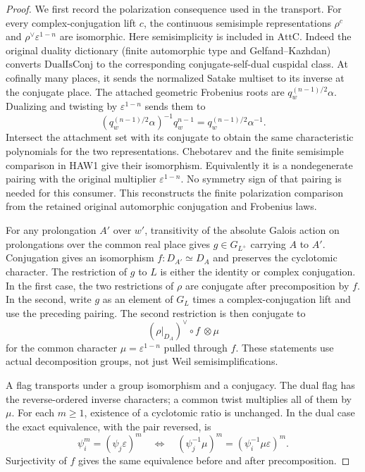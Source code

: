 \documentclass[11pt,a4paper]{article}
\numberwithin{equation}{section}
\theoremstyle{remark}\newtheorem{remark}[theorem]{Remark}
\begin{document}
\begin{proof}
We first record the polarization consequence used in the
transport.  For every complex-conjugation lift $c$, the
continuous semisimple representations
$\rho^c$ and $\rho^\vee\varepsilon^{1-n}$ are isomorphic.
Here semisimplicity is included in $\mathrm{AttC}$.
Indeed the original duality dictionary (finite automorphic
type and Gelfand--Kazhdan) converts $\mathrm{DualIsConj}$
to the corresponding conjugate-self-dual cuspidal class.
At cofinally many places, it sends the normalized Satake
multiset to its inverse at the conjugate place.  The attached
geometric Frobenius roots are $q_w^{(n-1)/2}\alpha$.
Dualizing and twisting by $\varepsilon^{1-n}$ sends them to
\[
       (q_w^{(n-1)/2}\alpha)^{-1}q_w^{n-1}
                             =q_w^{(n-1)/2}\alpha^{-1}.
\]
Intersect the attachment set with its conjugate to obtain
the same characteristic polynomials for the two
representations.  Chebotarev and the finite semisimple
comparison in HAW1 give their isomorphism.  Equivalently it
is a nondegenerate pairing with the original multiplier
$\varepsilon^{1-n}$.  No symmetry sign of that pairing is
needed for this consumer.  This reconstructs the finite
polarization comparison from the retained original
automorphic conjugation and Frobenius laws.

For any prolongation $A'$ over $w'$, transitivity of the
absolute Galois action on prolongations over the common real
place gives $g\in G_{L^+}$ carrying $A$ to $A'$.  Conjugation
gives an isomorphism $f:D_{A'}\simeq D_A$ and preserves
the cyclotomic character.  The restriction of $g$ to $L$ is
either the identity or complex conjugation.  In the first
case, the two restrictions of $\rho$ are conjugate after
precomposition by $f$.  In the second, write $g$ as an
element of $G_L$ times a complex-conjugation lift and use
the preceding pairing.  The second restriction is then
conjugate to
\[
          (\rho|_{D_A})^\vee\circ f\ \otimes\mu
 \tag{HAW.21}
\]
for the common character $\mu=\varepsilon^{1-n}$ pulled
through $f$.  These statements use actual decomposition
groups, not just Weil semisimplifications.

A flag transports under a group isomorphism and a conjugacy.
The dual flag has the reverse-ordered inverse characters;
a common twist multiplies all of them by $\mu$.
For each $m\ge1$, existence of a cyclotomic ratio is unchanged.
In the dual case the exact equivalence, with the pair reversed,
is
\[
 \psi_i^m=(\psi_j\varepsilon)^m
 \quad\Longleftrightarrow\quad
 (\psi_j^{-1}\mu)^m=(\psi_i^{-1}\mu\varepsilon)^m.
 \tag{HAW.22}
\]
Surjectivity of $f$ gives the same equivalence before and
after precomposition.


\end{proof}
\end{document}
